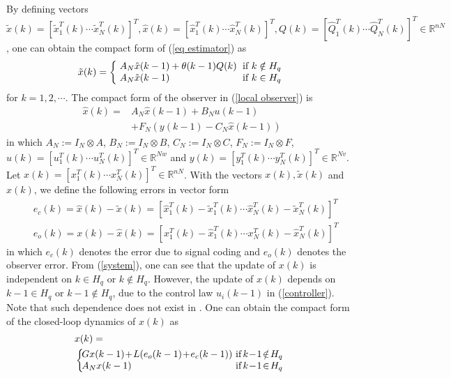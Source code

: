 \documentclass[letterpaper,journal,final,twocolumn]{IEEEtran}
\begin{document}
 



By defining vectors $\tilde x(k) = [\tilde  x_1 ^T (k) \cdots \tilde  x_N ^T (k)]^T, \hat x(k) = [\hat x_1 ^T  (k)  \cdots \hat x_N ^T (k)]^T, Q(k) = [\hat Q_1 ^T (k)  \cdots \hat Q_N ^T  (k)]^T  \in \mathbb{R}^{nN}$, one can obtain the compact form of (\ref{eq estimator}) as
\begin{eqnarray}\setlength{\arraycolsep}{3pt}  \label{eq estimator all}
\tilde x(k)  
=
\left\{
\begin{array}{ll}
A_N\tilde x(k-1) + \theta(k-1)Q(k) & \text{if $k \notin H_q$} \\
A_N \tilde x(k-1)        & \text{if $k \in H_q$} 
\end{array}
\right.
\end{eqnarray}
for $k=1, 2, \cdots$. The compact form of the observer in (\ref{local observer}) is 
\begin{align}\label{compact observer}
\hat x(k)=&A_N \hat x(k-1)  + B_N u(k-1)  \nonumber\\
&+ F_N(y(k-1)-C_N \hat x (k-1)) 
\end{align}
in which $A_N:=I_N \otimes A$, $B_N:=I_N \otimes B$, $C_N:=I_N \otimes C$, $F_N:=I_N \otimes F$, $u(k)=[u_1 ^T(k) \cdots u_N^T(k)]^T \in \mathbb R ^{N  w}$ and $y(k)=[y_1 ^T(k) \cdots y_N^T(k)]^T \in \mathbb R ^{N   v} $.
Let $x(k) = [x_1 ^T (k)\cdots x_N ^T (k)]^T \in \mathbb{R}^{nN}$. 
With the vectors $x(k), \tilde x(k)$ and $\hat x(k)$, we define the following errors in vector form
\begin{align*}
&\!\!\!\!  e_c(k)\!=\!\hat x(k) \!   -\! \tilde x(k) \!   =\! [\hat x_1 ^T(k) \!-\! \tilde x_1 ^T (k) \!\cdots\! \hat x_N ^T (k) \!-\! \tilde x_N  ^T(k)]^T  \\
&\!\!\!\!e_o(k) \!=\! x(k) \!   - \! \hat  x(k) \!=\! [ x_1  ^T (k) \!-\! \hat x_1  ^T (k)\!\cdots\! x_N  ^T (k) \!-\! \hat x_N  ^T (k)]^T
\end{align*}
in which $e_c(k)$ denotes the error due to signal coding and $e_o(k)$ denotes the observer error.
From (\ref{system}), one can see that the update of $x(k)$ is independent on $k \in H_q$ or $k \notin H_q$. However, the update of $x(k)$ depends on $k-1 \in H_q$ or $k-1 \notin H_q$, due to the control law $u_i(k-1)$ in (\ref{controller}). Note that such dependence does not exist in \cite{feng2020arxiv}.
One can obtain the compact form of the closed-loop dynamics of $x(k)$ as
\begin{align}\label{eq process all} 
&x(k) = \nonumber\\
&\left\{\!\!\!\!
\begin{array}{ll}\setlength{\arraycolsep}{0.1pt} 
 G x(k-1) \! + \! L(e_o(k-1) \!+\! e_c(k-1)) & \!\!\!\! \text{if}\, k\!-\!1 \!\notin\! H_q \\
A_N x(k-1) & \!\!\!\! \text{if}\, k\!-\!1 \!\in\! H_q 
\end{array}
 \right.
\end{align}
\end{document}
